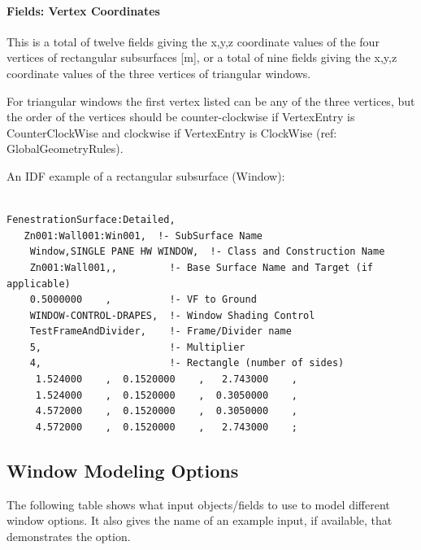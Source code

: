 \paragraph{Fields: Vertex Coordinates}\label{fields-vertex-coordinates}

This is a total of twelve fields giving the x,y,z coordinate values of the four vertices of rectangular subsurfaces {[}m{]}, or a total of nine fields giving the x,y,z coordinate values of the three vertices of triangular windows.

For triangular windows the first vertex listed can be any of the three vertices, but the order of the vertices should be counter-clockwise if VertexEntry is CounterClockWise and clockwise if VertexEntry is ClockWise (ref: GlobalGeometryRules).

An IDF example of a rectangular subsurface (Window):

\begin{lstlisting}

FenestrationSurface:Detailed,
   Zn001:Wall001:Win001,  !- SubSurface Name
    Window,SINGLE PANE HW WINDOW,  !- Class and Construction Name
    Zn001:Wall001,,         !- Base Surface Name and Target (if applicable)
    0.5000000    ,          !- VF to Ground
    WINDOW-CONTROL-DRAPES,  !- Window Shading Control
    TestFrameAndDivider,    !- Frame/Divider name
    5,                      !- Multiplier
    4,                      !- Rectangle (number of sides)
     1.524000    ,  0.1520000    ,   2.743000    ,
     1.524000    ,  0.1520000    ,  0.3050000    ,
     4.572000    ,  0.1520000    ,  0.3050000    ,
     4.572000    ,  0.1520000    ,   2.743000    ;
\end{lstlisting}

\subsection{Window Modeling Options}\label{window-modeling-options}

The following table shows what input objects/fields to use to model different window options. It also gives the name of an example input, if available, that demonstrates the option.

